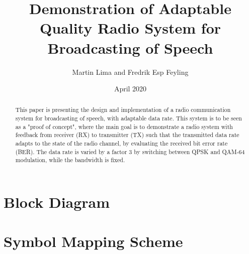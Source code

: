 \documentclass[9pt,journal]{IEEEtran}
\title{Demonstration of Adaptable Quality Radio System for Broadcasting of Speech}
\author{Martin Lima and Fredrik Esp Feyling }
\date{April 2020}
\begin{document}
\maketitle
\begin{abstract} 
This paper is presenting the design and implementation of a radio communication system for broadcasting of speech, with adaptable data rate. This system is to be seen as a "proof of concept", where the main goal is to demonstrate a radio system with feedback from receiver (RX) to transmitter (TX) such that the transmitted data rate adapts to the state of the radio channel, by evaluating the received bit error rate (BER). The data rate is varied by a factor 3 by switching between QPSK and QAM-64 modulation, while the bandwidth is fixed. 
\end{abstract}
















\appendices

\section{Block Diagram}
\label{a:block_diagram}



\section{Symbol Mapping Scheme}
\label{a:symbol_mapping}

\end{document}

